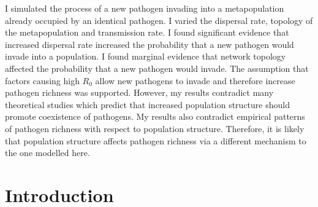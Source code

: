 %
%
I simulated the process of a new pathogen invading into a metapopulation already occupied by an identical pathogen.
I varied the dispersal rate, topology of the metapopulation and transmission rate.
I found significant evidence that increased dispersal rate increased the probability that a new pathogen would invade into a population.
I found marginal evidence that network topology affected the probability that a new pathogen would invade.
The assumption that factors causing high $R_0$ allow new pathogens to invade and therefore increase pathogen richness was supported.
However, my results contradict many theoretical studies which predict that increased population structure should promote coexistence of pathogens.
My results also contradict empirical patterns of pathogen richness with respect to population structure.
Therefore, it is likely that population structure affects pathogen richness via a different mechanism to the one modelled here.
%
%









\section{Introduction}







